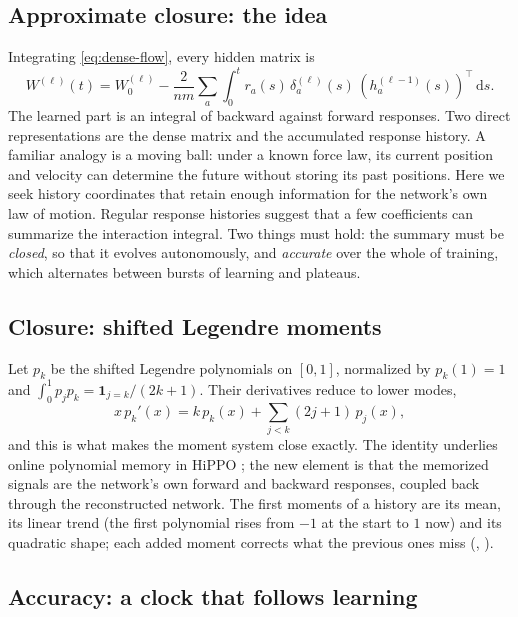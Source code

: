 \documentclass[11pt]{article}
\theoremstyle{definition}
\theoremstyle{remark}
\newcommand{\dd}{\,\mathrm{d}}
\begin{document}
\subsection{Approximate closure: the idea}

Integrating \eqref{eq:dense-flow}, every hidden matrix is
\begin{equation}
 W^{(\ell)}(t)=W_0^{(\ell)}-\frac{2}{nm}\sum_a
 \int_0^t r_a(s)\,\delta_a^{(\ell)}(s)\,
 (h_a^{(\ell-1)}(s))^\top\dd s .                        \label{eq:exact-history}
\end{equation}
The learned part is an integral of backward against forward responses.  Two
direct representations are the dense matrix and the accumulated response
history.  A familiar analogy is a moving ball: under a known force law, its
current position and velocity can determine the future without storing its past
positions.  Here we seek history coordinates that retain enough information
for the network's own law of motion.  Regular response histories suggest that
a few coefficients can summarize the interaction integral.  Two things must
hold: the summary must be
\emph{closed}, so that it evolves autonomously, and \emph{accurate} over the
whole of training, which alternates between bursts of learning and plateaus.

\subsection{Closure: shifted Legendre moments}

Let $p_k$ be the shifted Legendre polynomials on $[0,1]$, normalized by
$p_k(1)=1$ and $\int_0^1p_jp_k=\mathbf 1_{j=k}/(2k+1)$.  Their derivatives reduce
to lower modes,
\begin{equation}
 x\,p_k'(x)=k\,p_k(x)+\sum_{j<k}(2j+1)\,p_j(x),        \label{eq:triangular}
\end{equation}
and this is what makes the moment system close exactly.  The identity underlies
online polynomial memory in HiPPO \citep{gu2020hippo}; the new element is that
the memorized signals are the network's own forward and backward responses,
coupled back through the reconstructed network.
The first moments of a history are its mean, its linear trend (the first
polynomial rises from $-1$ at the start to $1$ now) and its quadratic shape;
each added moment corrects what the previous ones miss (, ).

\subsection{Accuracy: a clock that follows learning}
\end{document}
